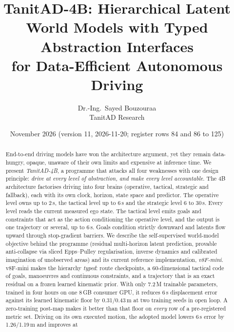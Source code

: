 \documentclass[10pt,twocolumn]{article}
\title{\vspace{-6mm}\textbf{TanitAD-4B: Hierarchical Latent World Models with Typed Abstraction Interfaces\\for Data-Efficient Autonomous Driving}}
\author{Dr.-Ing.\ Sayed Bouzouraa\\[1mm]\normalsize TanitAD Research}
\date{November 2026 (version 11, 2026-11-20; register rows 84 and 86 to 125)}
\theoremstyle{remark}
\begin{document}
\maketitle

\begin{abstract}
End-to-end driving models have won the architecture argument, yet they remain data-hungry, opaque, unaware of their own limits and
expensive at inference time. We present \emph{TanitAD-4B}, a programme that attacks all four weaknesses with one design principle:
\emph{drive at every level of abstraction, and make every level accountable}. The 4B architecture factorises driving into four
brains (operative, tactical, strategic and fallback), each with its own clock, horizon, state space and predictor. The operative
level owns up to 2\,s, the tactical level up to 6\,s and the strategic level 6 to 30\,s. Every level reads the current measured ego state.
The tactical level emits goals and constraints that act as the action conditioning the operative level, and the output is one
trajectory or several, up to 6\,s. Goals condition strictly downward and latents flow upward through stop-gradient barriers. We describe the self-supervised world-model objective
behind the programme (residual multi-horizon latent prediction, provable anti-collapse via sliced Epps--Pulley regularisation,
inverse dynamics and calibrated imagination of unobserved areas) and its current reference implementation, \emph{v8F-mini}.
v8F-mini makes the hierarchy \emph{typed}: route checkpoints, a 60-dimensional tactical code of goals, manoeuvres and continuous
constraints, and a trajectory that is an exact residual on a frozen learned kinematic prior. With only 7.2\,M trainable parameters,
trained in four hours on one 8\,GB consumer GPU, it reduces 6\,s displacement error against its learned kinematic floor by
0.31/0.43\,m at two training seeds in open loop. A zero-training post-map makes it better than that floor on \emph{every} row of a
pre-registered metric set. Driving on its own executed motion, the adopted model lowers 6\,s error by 1.26/1.19\,m and improves at

\end{abstract}
\end{document}
